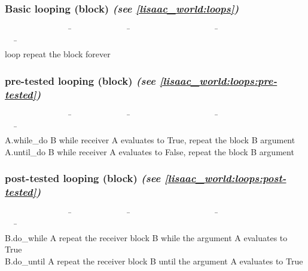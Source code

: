 \documentclass[11pt]{mybook}
\begin{document}
\subsubsection{Basic looping (\sc{}block) {\it{}(see \ref{lisaac_world:loops})}}
\label{lisaac_world:glossary:control:basic_loop}
\begin{tabbing}
~~~~~~~~~~~~~~~~\=~~~~~~~~~~~~~~\=~~~~~~~~~~~~~~~~~~~~~\=~~~~~~~~~~~~~~~~~~~~~~~~\=\kill\\
{loop}          \>        \> {repeat the block forever}                    \\
\end{tabbing}
\subsubsection{pre-tested looping (\sc{}block) {\it{}(see \ref{lisaac_world:loops:pre-tested})}}
\label{lisaac_world:glossary:control:pre_loop}
\begin{tabbing}
~~~~~~~~~~~~~~~~\=~~~~~~~~~~~~~~\=~~~~~~~~~~~~~~~~~~~~~\=~~~~~~~~~~~~~~~~~~~~~~~~\=\kill\\
{A.while\_do B}     \>        \> {while receiver A evaluates to True, repeat the block B argument} \\
{A.until\_do B}     \>        \> {while receiver A evaluates to False, repeat the block B argument} \\
\end{tabbing}
\subsubsection{post-tested looping (\sc{}block) {\it{}(see \ref{lisaac_world:loops:post-tested})}}
\label{lisaac_world:glossary:control:post_loop}
\begin{tabbing}
~~~~~~~~~~~~~~~~\=~~~~~~~~~~~~~~\=~~~~~~~~~~~~~~~~~~~~~\=~~~~~~~~~~~~~~~~~~~~~~~~\=\kill\\
{B.do\_while A}     \>        \> {repeat the receiver block B while the argument A evaluates to True} \\
{B.do\_until A}     \>        \> {repeat the receiver block B until the argument A evaluates to True} \\
\end{tabbing}
\end{document}
